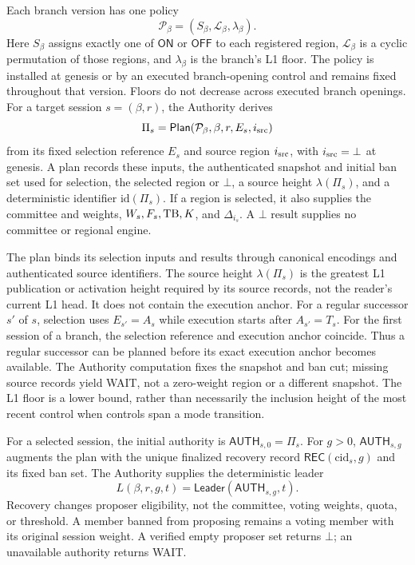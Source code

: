 \begin{definition}
\label{def:policy-plan}
Each branch version has one policy
\[
 \mathcal P_\beta=(S_\beta,\mathcal L_\beta,\lambda_\beta).
\]
Here $S_\beta$ assigns exactly one of $\mathsf{ON}$ or $\mathsf{OFF}$ to
each registered region, $\mathcal L_\beta$ is a cyclic permutation of
those regions, and $\lambda_\beta$ is the branch's L1 floor. The policy
is installed at genesis or by an executed branch-opening control and
remains fixed throughout that version. Floors do not decrease across
executed branch openings.
For a target session $s=(\beta,r)$, the Authority derives
\[
 \Pi_s=\mathsf{Plan}(\mathcal P_\beta,\beta,r,E_s,i_{\rm src})
\]
from its fixed selection reference $E_s$ and source region $i_{\rm src}$,
with $i_{\rm src}=\bot$ at genesis.
A plan records these inputs, the authenticated snapshot and initial ban
set used for selection, the selected region or $\bot$, a source height
$\lambda(\Pi_s)$, and a deterministic identifier $\mathrm{id}(\Pi_s)$.
If a region is selected, it also supplies the committee and weights,
$W_s,F_s,\mathrm{TB},K$, and $\Delta_{i_s}$. A $\bot$ result supplies no
committee or regional engine.
\end{definition}
The plan binds its selection inputs and results through canonical
encodings and authenticated source identifiers. The source height $\lambda(\Pi_s)$ is the greatest L1 publication or
activation height required by its source records, not the reader's
current L1 head. It does not contain the execution anchor. For a regular successor $s'$ of $s$, selection uses
$E_{s'}=A_s$ while execution starts after $A_{s'}=T_s$. For the first
session of a branch, the selection reference and execution anchor
coincide. Thus a regular successor can be planned before its exact
execution anchor becomes available. The Authority computation fixes the
snapshot and ban cut; missing source records yield \textsf{WAIT}, not a
zero-weight region or a different snapshot. The L1 floor is a lower
bound, rather than necessarily the inclusion height of the most recent
control when controls span a mode transition.

For a selected session, the initial authority is
$\mathsf{AUTH}_{s,0}=\Pi_s$. For $g>0$,
$\mathsf{AUTH}_{s,g}$ augments the plan with the unique finalized recovery
record $\mathsf{REC}(\mathrm{cid}_s,g)$ and its fixed ban set. The
Authority supplies the deterministic leader
\[
 L(\beta,r,g,t)=\mathsf{Leader}(\mathsf{AUTH}_{s,g},t).
\]
Recovery changes proposer eligibility, not the committee, voting weights,
quota, or threshold. A member banned from proposing remains a voting
member with its original session weight. A verified empty proposer set
returns $\bot$; an unavailable authority returns \textsf{WAIT}.


